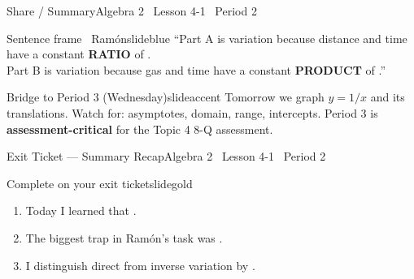 \documentclass[aspectratio=169, 14pt]{beamer}
\begin{document}
\begin{frame}{Share / Summary}{Algebra 2 \textperiodcentered\ Lesson 4-1 \textperiodcentered\ Period 2}
\vspace{0.2cm}
\begin{projcard}{Sentence frame \textperiodcentered\ Ramón}{slideblue}
``Part A is \underline{\hspace{1cm}} variation because distance and time
have a constant \textbf{RATIO} of \underline{\hspace{1cm}}.\\
Part B is \underline{\hspace{1cm}} variation because gas and time have
a constant \textbf{PRODUCT} of \underline{\hspace{1cm}}.''
\end{projcard}

\vspace{0.15cm}
\begin{projcard}{Bridge to Period 3 (Wednesday)}{slideaccent}
Tomorrow we graph \(y = 1/x\) and its translations.
Watch for: asymptotes, domain, range, intercepts.
Period 3 is \textbf{assessment-critical} for the Topic 4 8-Q assessment.
\end{projcard}
\end{frame}

\begin{frame}{Exit Ticket --- Summary Recap}{Algebra 2 \textperiodcentered\ Lesson 4-1 \textperiodcentered\ Period 2}
\vspace{0.2cm}
\begin{projcard}{Complete on your exit ticket}{slidegold}
\begin{enumerate}
  \setlength{\itemsep}{0.2cm}
  \item Today I learned that \underline{\hspace{5cm}}.
  \item The biggest trap in Ramón's task was \underline{\hspace{5cm}}.
  \item I distinguish direct from inverse variation by \underline{\hspace{5cm}}.
\end{enumerate}
\end{projcard}
\end{frame}
\end{document}
